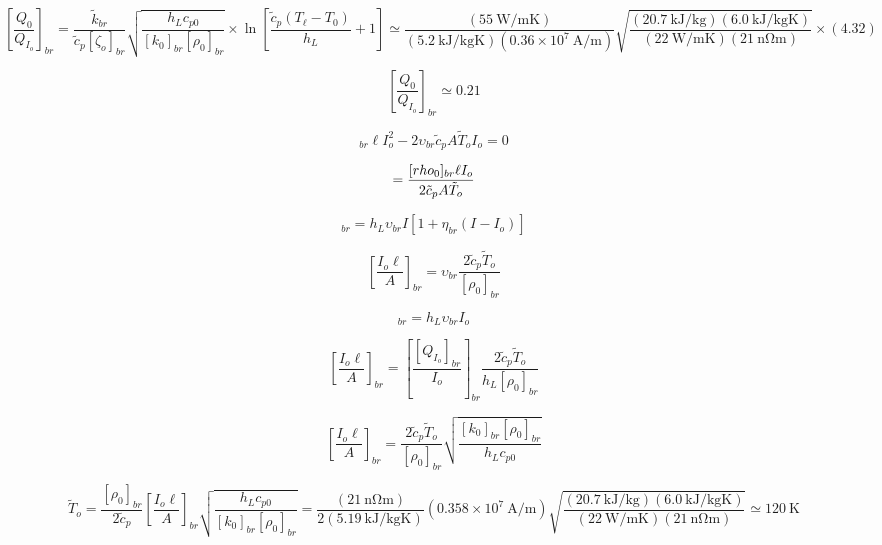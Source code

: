\begin{equation}
\left[\frac{Q_0}{Q_{I_o}}\right]_{br}=\frac{\tilde{k}_{br}}{\tilde{c}_p[\zeta_o]_{br}}\sqrt{\frac{h_Lc_{p0}}{[k_0]_{br}[\rho_0]_{br}}}\times\ln\left[\frac{\tilde{c}_p(T_\ell-T_0)}{h_L}+1\right] 
\simeq\frac{(55\ \mathrm{W/mK})}{(5.2\ \mathrm{kJ/kgK})(0.36\times 10^7\ \mathrm{A/m})}\sqrt{\frac{(20.7\ \mathrm{kJ/kg})(6.0\ \mathrm{kJ/kgK})}{(22\ \mathrm{W/mK})(21\ \mathrm{n\Omega m})}}\times(4.32)
\end{equation}

\begin{equation}%
\left[\frac{Q_0}{Q_{I_o}}\right]_{br}\simeq0.21
\end{equation}

\begin{equation}
[\rho_0]_{br}\ell I_{o}^{2}-2\upsilon_{br}\tilde{c}_pA\tilde{T}_oI_o=0
\end{equation}

\begin{equation}%
\unboldmath=\frac{[rho_0]_{br}\ell I_o}{2\tilde{c}_pA\tilde{T}_o}
\end{equation}

\begin{equation}%
[Q_{I_o}]_{br}=h_L\upsilon_{br}I[1+\eta_{br}(I-I_o)]
\end{equation}

\begin{equation}
\left[\frac{I_o\ell}{A}\right]_{br}=\upsilon_{br}\frac{2\tilde{c}_p\tilde{T}_o}{[\rho_0]_{br}}
\end{equation}

\begin{equation}
[Q_{I_o}]_{br}=h_L\upsilon_{br}I_o
\end{equation}

\begin{equation}
\left[\frac{I_o\ell}{A}\right]_{br}=\left[\frac{[Q_{I_o}]_{br}}{I_o}\right]_{br}\frac{2\tilde{c}_p\tilde{T}_o}{h_L[\rho_0]_{br}}
\end{equation}

\begin{equation}%
\left[\frac{I_o\ell}{A}\right]_{br}=\frac{2\tilde{c}_p\tilde{T}_o}{[\rho_0]_{br}}\sqrt{\frac{[k_0]_{br}[\rho_0]_{br}}{h_Lc_{p0}}}
\end{equation}

\begin{equation}
\tilde{T}_o=\frac{[\rho_0]_{br}}{2\tilde{c}_p}\left[\frac{I_o\ell}{A}\right]_{br}\sqrt{\frac{h_Lc_{p0}}{[k_0]_{br}[\rho_0]_{br}}} 
=\frac{(21\ \mathrm{n\Omega m})}{2(5.19\ \mathrm{kJ/kgK})}(0.358\times 10^7\ \mathrm{A/m})\sqrt{\frac{(20.7\ \mathrm{kJ/kg})(6.0\ \mathrm{kJ/kgK})}{(22\ \mathrm{W/mK})(21\ \mathrm{n\Omega m})}}
\simeq 120\ \mathrm{K}
\end{equation}

